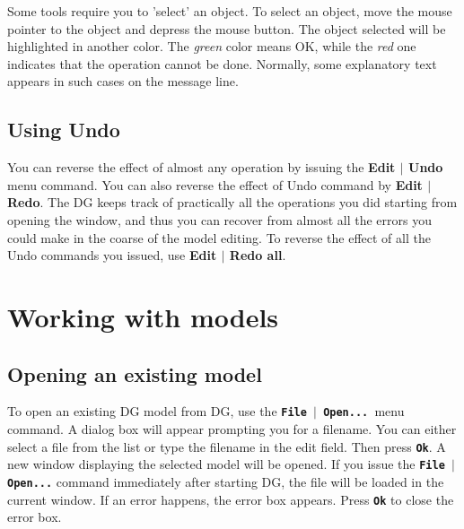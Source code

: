 \documentclass[12pt]{report}
\begin{document}
Some tools require you to 'select' an object. To select an object,
move the mouse pointer to the object and depress the mouse button. The
object selected will be highlighted in another color. The
\textit{green} color means OK, while the \textit{red} one indicates
that the operation cannot be done. Normally, some explanatory text
appears in such cases on the message line.

\section{Using Undo}

You can reverse the effect of almost any operation by issuing the
\textbf{Edit \begin{math}\vert{}\end{math} Undo} menu command. You can
also reverse the effect of Undo command by
\textbf{Edit \begin{math}\vert{}\end{math} Redo}. The DG keeps track of
practically all the operations you did starting from opening the
window, and thus you can recover from almost all the errors you could
make in the coarse of the model editing. To reverse the effect of all
the Undo commands you issued, use
\textbf{Edit \begin{math}\vert{}\end{math} Redo all}.

\chapter{Working with models}
\section{Opening an existing model}

To open an existing DG model from DG, use the
\textbf{\texttt{File \begin{math}\vert{}\end{math} Open... }}menu
command. A dialog box will appear prompting you for a filename. You can
either select a file from the list or type the filename in the edit
field. Then press \textbf{\texttt{Ok}}. A new window displaying the
selected model will be opened. If you issue the
\textbf{\texttt{File \begin{math}\vert{}\end{math} Open...}} command
immediately after starting DG, the file will be loaded in the current
window. If an error happens, the error box appears. Press
\textbf{\texttt{Ok}} to close the error box.
\end{document}
